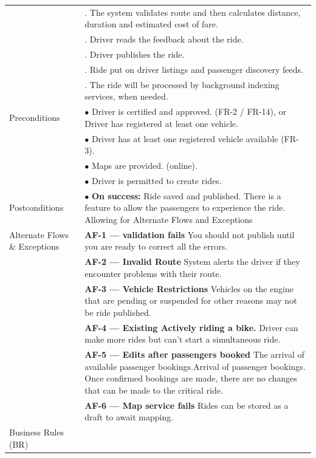 \begin{longtable}{|>{\raggedright\arraybackslash}p{4cm}|>{\raggedright\arraybackslash}p{11cm}|}
& 7. The system validates route and then calculates distance, duration and estimated cost of fare. \\
& 8. Driver reads the feedback about the ride. \\
& 9. Driver publishes the ride. \\
& 10. Ride put on driver listings and passenger discovery feeds. \\
& 11. The ride will be processed by background indexing services, when needed. \\
\hline
Preconditions & $\bullet$ Driver is certified and approved. (FR-2 / FR-14), or Driver has registered at least one vehicle. \\
& $\bullet$ Driver has at least one registered vehicle available (FR-3). \\
& $\bullet$ Maps are provided. (online). \\
& $\bullet$ Driver is permitted to create rides. \\
\hline
Postconditions & $\bullet$ \textbf{On success:} Ride saved and published. There is a feature to allow the passengers to experience the ride. Allowing for Alternate Flows and Exceptions \\
\hline
Alternate Flows \& Exceptions & \textbf{AF-1 — validation fails} \newline You should not publish until you are ready to correct all the errors. \\
& \textbf{AF-2 — Invalid Route} \newline System alerts the driver if they encounter problems with their route. \\
& \textbf{AF-3 — Vehicle Restrictions} \newline Vehicles on the engine that are pending or suspended for other reasons may not be ride published. \\
& \textbf{AF-4 — Existing Actively riding a bike.} \newline Driver can make more rides but can't start a simultaneous ride. \\
& \textbf{AF-5 — Edits after passengers booked} \newline The arrival of available passenger bookings.Arrival of passenger bookings. Once confirmed bookings are made, there are no changes that can be made to the critical ride. \\
& \textbf{AF-6 — Map service fails} \newline Rides can be stored as a draft to await mapping. \\
\hline
Business Rules (BR) & \\

\end{longtable}
